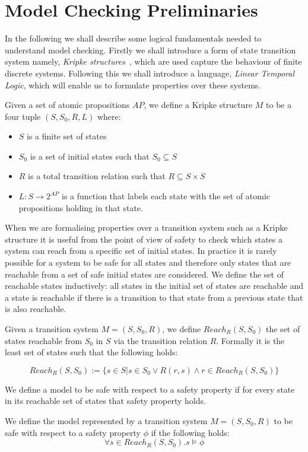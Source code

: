 \section{Model Checking Preliminaries}
In the following we shall describe some logical fundamentals needed to understand model checking. Firstly we shall introduce a form of state transition system namely, \emph{Kripke structures}~\cite{SK63}, which are used capture the behaviour of finite discrete systems. Following this we shall introduce a language, \emph{Linear Temporal Logic}, which will enable us to formulate properties over these systems.
\medskip
\begin{mydef}
Given a set of atomic propositions $AP$, we define a Kripke structure $M$ to be a four tuple $(S, S_0, R, L)$
where:
\begin{itemize} 
\item $S$ is a finite set of states
\item $S_0$ is a set of initial states such that $S_0 \subseteq S$
\item $R$ is a total transition relation such that $R \subseteq S \times S$
\item $L: S \to 2^{AP}$ is a function that labels each state with the set of atomic propositions holding in that state.
\end{itemize}
\end{mydef}
\medskip
When we are formalising properties over a transition system such as a Kripke structure it is useful from the point of view of safety to check which states a system can reach from a specific set of initial states. In practice it is rarely possible for a system to be safe for all states and therefore only states that are reachable from a set of safe initial states are considered. We define the set of reachable states inductively: all states in the initial set of states are reachable and a state is reachable if there is a transition to that state from a previous state that is also reachable.
\medskip
\begin{mydef}[Reachability]
Given a transition system $M = (S,S_0, R)$, we define $Reach_R(S, S_0)$ the set of states reachable from $S_0$ in $S$ via the transition relation $R$. Formally it is the least set of states such that the following holds: 

$$ Reach_R(S,S_0) := \{s \in S | s \in S_0 \vee R(r,s) \wedge r \in Reach_R(S,S_0)\} $$

\end{mydef}
\medskip
We define a model to be safe with respect to a safety property if for every state in its reachable set of states that safety property holds.
\medskip
\begin{mydef}
We define the model represented by a transition system $M = (S,S_0, R)$ to be safe with respect to a safety property $\phi$ if the following holds:
$$\forall s \in Reach_R(S,S_0). s \models \phi $$

\end{mydef}
\medskip
\newcommand{\sseq}[2]{s_{{[}#1 \ldots #2 {]}} }

